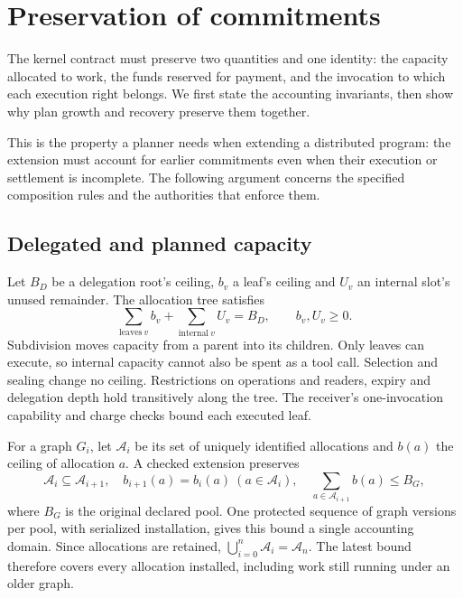 \section{Preservation of commitments}
\label{sec:preservation}
The kernel contract must preserve two quantities and one identity: the capacity
allocated to work, the funds reserved for payment, and the invocation to which
each execution right belongs. We first state the accounting invariants, then
show why plan growth and recovery preserve them together.

This is the property a planner needs when extending a distributed program:
the extension must account for earlier commitments even when their execution
or settlement is incomplete. The following argument concerns the specified
composition rules and the authorities that enforce them.

\subsection{Delegated and planned capacity}
Let $B_D$ be a delegation root's ceiling, $b_v$ a leaf's ceiling and $U_v$ an
internal slot's unused remainder. The allocation tree satisfies
\begin{equation}
 \sum_{\mathrm{leaves}\ v}b_v+\sum_{\mathrm{internal}\ v}U_v=B_D,
 \qquad b_v,U_v\geq0. \label{eq:delegation}
\end{equation}
Subdivision moves capacity from a parent into its children. Only leaves can
execute, so internal capacity cannot also be spent as a tool call. Selection
and sealing change no ceiling. Restrictions on operations and readers, expiry
and delegation depth hold transitively along the tree. The receiver's
one-invocation capability and charge checks bound each executed leaf.

For a graph $G_i$, let $\mathcal{A}_i$ be its set of uniquely identified
allocations and $b(a)$ the ceiling of allocation $a$. A checked extension
preserves
\begin{equation}
 \mathcal{A}_i\subseteq\mathcal{A}_{i+1},\quad
 b_{i+1}(a)=b_i(a)\ (a\in\mathcal{A}_i),\quad
 \sum_{a\in\mathcal{A}_{i+1}}b(a)\leq B_G, \label{eq:growth}
\end{equation}
where $B_G$ is the original declared pool. One protected sequence of graph
versions per pool, with serialized installation, gives this bound a single
accounting domain. Since allocations are retained,
$\bigcup_{i=0}^{n}\mathcal{A}_i=\mathcal{A}_n$. The latest bound therefore covers
every allocation installed, including work still running under an older graph.

